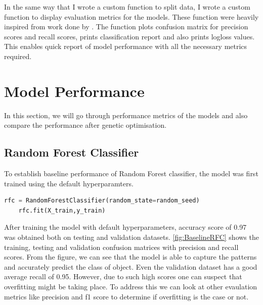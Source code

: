 In the same way that I wrote a custom function to split data, I wrote a custom function to display evaluation metrics for the models. These function were heavily inspired from work done by \cite{towardsdatascienceStellarClassification}. The function plots confusion matrix for precision scores and recall scores, prints classification report and also prints logloss values. This enables quick report of model performance with all the necessary metrics required.

\section{Model Performance}
In this section, we will go through performance metrics of the models and also compare the performance after genetic optimisation.

\subsection{Random Forest Classifier}

To establish baseline performance of Random Forest classifier, the model was first trained using the default hyperparamters. 

\begin{lstlisting}[language=Python]
    rfc = RandomForestClassifier(random_state=random_seed)
    rfc.fit(X_train,y_train)
\end{lstlisting}

After training the model with default hyperparameters, accuracy score of 0.97 was obtained both on testing and validation datasets. \autoref{fig:BaselineRFC} shows the training, testing and validation confusion matrices with precision and recall scores. From the figure, we can see that the model is able to capture the patterns and accurately predict the class of object. Even the validation dataset has a good average recall of 0.95. However, due to such high scores one can suspect that overfitting might be taking place. To address this we can look at other evaulation metrics like  precision and f1 score to determine if overfitting is the case or not.

